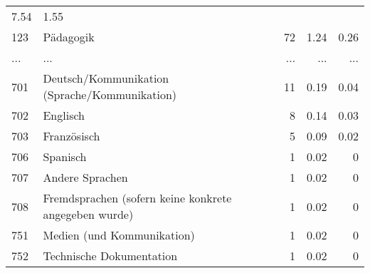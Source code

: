 \begin{longtable}{lXrrr}
          \num[round-mode=places,round-precision=2]{7,54} &
          \num[round-mode=places,round-precision=2]{1,55} \\
        123 & \multicolumn{1}{X}{Pädagogik} & %
          \num{72} &
          \num[round-mode=places,round-precision=2]{1,24} &
          \num[round-mode=places,round-precision=2]{0,26} \\
       ... & ... & ... & ... & ... \\
        701 & \multicolumn{1}{X}{Deutsch/Kommunikation (Sprache/Kommunikation)} & %
          \num{11} &
          \num[round-mode=places,round-precision=2]{0,19} &
          \num[round-mode=places,round-precision=2]{0,04} \\

        702 & \multicolumn{1}{X}{Englisch} & %
          \num{8} &
          \num[round-mode=places,round-precision=2]{0,14} &
          \num[round-mode=places,round-precision=2]{0,03} \\

        703 & \multicolumn{1}{X}{Französisch} & %
          \num{5} &
          \num[round-mode=places,round-precision=2]{0,09} &
          \num[round-mode=places,round-precision=2]{0,02} \\

        706 & \multicolumn{1}{X}{Spanisch} & %
          \num{1} &
          \num[round-mode=places,round-precision=2]{0,02} &
          \num[round-mode=places,round-precision=2]{0} \\

        707 & \multicolumn{1}{X}{Andere Sprachen} & %
          \num{1} &
          \num[round-mode=places,round-precision=2]{0,02} &
          \num[round-mode=places,round-precision=2]{0} \\

        708 & \multicolumn{1}{X}{Fremdsprachen (sofern keine konkrete angegeben wurde)} & %
          \num{1} &
          \num[round-mode=places,round-precision=2]{0,02} &
          \num[round-mode=places,round-precision=2]{0} \\

        751 & \multicolumn{1}{X}{Medien (und Kommunikation)} & %
          \num{1} &
          \num[round-mode=places,round-precision=2]{0,02} &
          \num[round-mode=places,round-precision=2]{0} \\

        752 & \multicolumn{1}{X}{Technische Dokumentation} & %
          \num{1} &
          \num[round-mode=places,round-precision=2]{0,02} &
          \num[round-mode=places,round-precision=2]{0} \\


\end{longtable}
